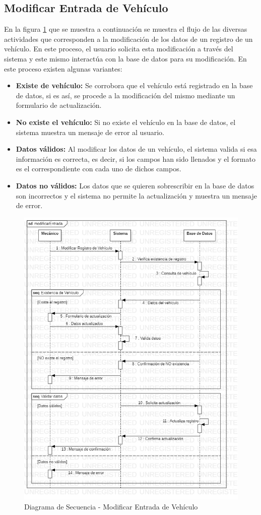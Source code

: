 \subsection{Modificar Entrada de Vehículo}
En la figura \ref{fig:Diagrama de Secuencia - Modificar Entrada de Vehículo} que se muestra a continuación se muestra el flujo de las diversas actividades que corresponden a la modificación de los datos de un registro de un vehículo. En este proceso, el usuario solicita esta modificación a través del sistema y este mismo interactúa con la base de datos para su modificación. En este proceso existen algunas variantes:
\begin{itemize}
	\item \textbf{Existe de vehículo:} Se corrobora que el vehículo está registrado en la base de datos, si es así, se procede a la modificación del mismo mediante un formulario de actualización.
	\item \textbf{No existe el vehículo:} Si no existe el vehículo en la base de datos, el sistema muestra un mensaje de error al usuario.
	\item \textbf{Datos válidos:} Al modificar los datos de un vehículo, el sistema valida si esa información es correcta, es decir, si los campos han sido llenados y el formato es el correspondiente con cada uno de dichos campos.
	\item \textbf{Datos no válidos:} Los datos que se quieren sobrescribir en la base de datos son incorrectos y el sistema no permite la actualización y muestra un mensaje de error.
\end{itemize}
\begin{figure}[!h]
	\centering
	\includegraphics[width=1\textwidth]{./diseno/vprocesos/imagenes/modificarEntrada}
	\caption{Diagrama de Secuencia - Modificar Entrada de Vehículo}
	\label{fig:Diagrama de Secuencia - Modificar Entrada de Vehículo}
\end{figure}
\clearpage